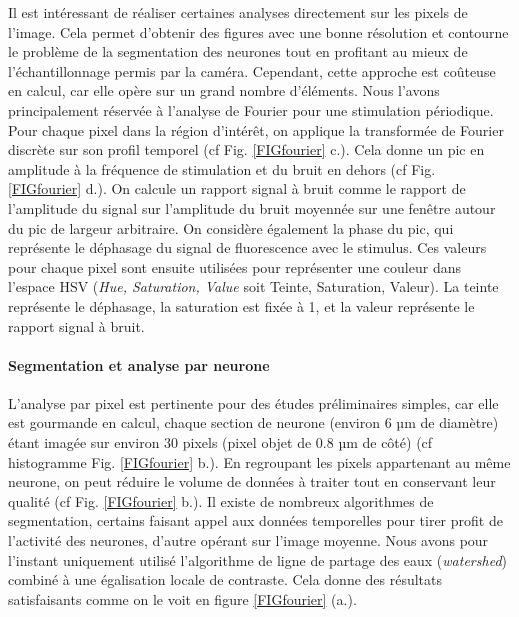 Il est intéressant de réaliser certaines analyses directement sur les pixels de l'image. Cela permet d'obtenir des figures avec une bonne résolution et contourne le problème de la segmentation des neurones tout en profitant au mieux de l'échantillonnage permis par la caméra. Cependant, cette approche est coûteuse en calcul, car elle opère sur un grand nombre d'éléments. Nous l'avons principalement réservée à l'analyse de Fourier pour une stimulation périodique.
Pour chaque pixel dans la région d'intérêt, on applique la transformée de Fourier discrète sur son profil temporel (cf Fig. \ref{FIGfourier} c.). Cela donne un pic en amplitude à la fréquence de stimulation et du bruit en dehors (cf Fig. \ref{FIGfourier} d.). On calcule un rapport signal à bruit comme le rapport de l'amplitude du signal sur l'amplitude du bruit moyennée sur une fenêtre autour du pic de largeur arbitraire. On considère également la phase du pic, qui représente le déphasage du signal de fluorescence avec le stimulus.
Ces valeurs pour chaque pixel sont ensuite utilisées pour représenter une couleur dans l'espace HSV (\emph{Hue, Saturation, Value} soit Teinte, Saturation, Valeur). La teinte représente le déphasage, la saturation est fixée à 1, et la valeur représente le rapport signal à bruit. 

\paragraph{Segmentation et analyse par neurone}

L'analyse par pixel est pertinente pour des études préliminaires simples, car elle est gourmande en calcul, chaque section de neurone (environ 6 µm de diamètre) étant imagée sur environ 30 pixels (pixel objet de 0.8 µm de côté) (cf histogramme Fig. \ref{FIGfourier} b.). En regroupant les pixels appartenant au même neurone, on peut réduire le volume de données à traiter tout en conservant leur qualité (cf Fig. \ref{FIGfourier} b.). Il existe de nombreux algorithmes de segmentation, certains faisant appel aux données temporelles pour tirer profit de l'activité des neurones, d'autre opérant sur l'image moyenne. Nous avons pour l'instant uniquement utilisé l'algorithme de ligne de partage des eaux (\emph{watershed}) combiné à une égalisation locale de contraste. Cela donne des résultats satisfaisants comme on le voit en figure \ref{FIGfourier} (a.).



